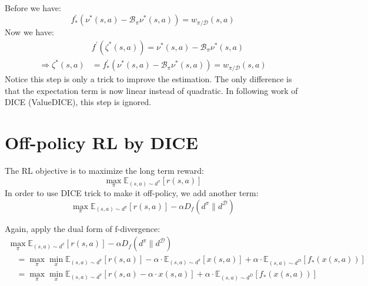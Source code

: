 \documentclass[a4paper]{article}
\theoremstyle{definition}
\begin{document}
Before we have:
\begin{equation}
f_{*}^{\prime}\left(\nu^{*}(s, a)-\mathcal{B}_{\pi} \nu^{*}(s, a)\right)=w_{\pi / \mathcal{D}}(s, a)
\end{equation}
Now we have:
\begin{equation}
\begin{aligned} & f^{\prime}\left(\zeta^{*}(s, a)\right)=\nu^{*}(s, a)-\mathcal{B}_{\pi} \nu^{*}(s, a) \\ \Rightarrow \zeta^{*}(s, a) &=f_{*}^{\prime}\left(\nu^{*}(s, a)-\mathcal{B}_{\pi} \nu^{*}(s, a)\right)=w_{\pi / \mathcal{D}}(s, a) \end{aligned}
\end{equation}
Notice this step is only a trick to improve the estimation. The only difference is that the expectation term is now linear instead of quadratic. In following work of DICE (ValueDICE), this step is ignored.

\section{Off-policy RL by DICE}
The RL objective is to maximize the long term reward:
\begin{equation}
\max _{\pi} \mathbb{E}_{(s, a) \sim d^{\pi}}[r(s, a)]
\end{equation}
In order to use DICE trick to make it off-policy, we add another term:
\begin{equation}
\max _{\pi} \mathbb{E}_{(s, a) \sim d^{\pi}}[r(s, a)]-\alpha D_{f}\left(d^{\pi} \| d^{\mathcal{D}}\right)
\end{equation}

Again, apply the dual form of f-divergence:
\begin{equation}
\begin{array}{l}{\max _{\pi} \mathbb{E}_{(s, a) \sim d^{\pi}}[r(s, a)]-\alpha D_{f}\left(d^{\pi} \| d^{\mathcal{D}}\right)} \\ {\quad=\max _{\pi} \min _{x} \mathbb{E}_{(s, a) \sim d^{\pi}}[r(s, a)]-\alpha \cdot \mathbb{E}_{(s, a) \sim d^{\pi}}[x(s, a)]+\alpha \cdot \mathbb{E}_{(s, a) \sim d^{D}}\left[f_{*}(x(s, a))\right]}\\
\quad=\max _{\pi} \min _{x} \mathbb{E}_{(s, a) \sim d^{\pi}}[r(s, a)-\alpha \cdot x(s, a)]+\alpha \cdot \mathbb{E}_{(s, a) \sim d^{D}}\left[f_{*}(x(s, a))\right]\end{array}
\end{equation}
\end{document}
